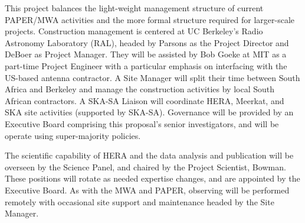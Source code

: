 \documentclass[preprint]{aastex}
\begin{document}
This project balances the light-weight management structure of current PAPER/MWA
activities and the more formal structure required for larger-scale projects.
Construction management is centered at UC Berkeley's Radio Astronomy Laboratory
(RAL), headed by Parsons as the Project Director and DeBoer as
Project Manager. They will be assisted by Bob Goeke at MIT as a part-time
Project Engineer with a particular emphasis on interfacing with the US-based
antenna contractor.  A Site Manager will split their time between South Africa
and Berkeley and manage the construction activities by local South African
contractors. A SKA-SA Liaison will coordinate HERA, Meerkat, and SKA site
activities (supported by SKA-SA). Governance will be provided by an Executive Board comprising
this proposal's senior investigators, and will be operate using
super-majority policies. 

The scientific capability of HERA and the data analysis and publication will be
overseen by the Science Panel, and chaired by the Project Scientist, Bowman. These
positions will rotate as needed expertise changes, and are appointed by the
Executive Board.  As with the MWA and PAPER, observing
will be performed remotely with occasional site support
and maintenance headed by the Site Manager.

%
\end{document}
